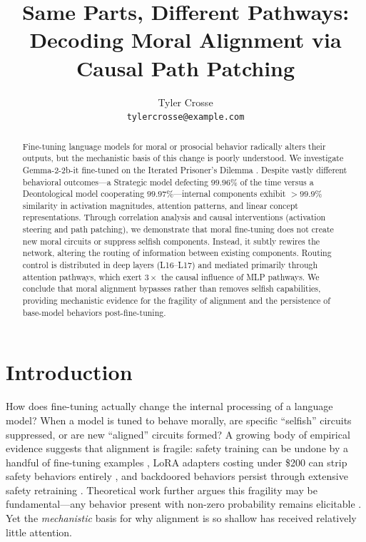 \documentclass[11pt, letterpaper]{article}
\title{\vspace{-1.5cm}\textbf{Same Parts, Different Pathways: \\ Decoding Moral Alignment via Causal Path Patching}}
\author{
  Tyler Crosse \\
  \texttt{tylercrosse@example.com}
}
\date{}
\begin{document}
\maketitle

\vspace{-1cm}
\begin{abstract}
Fine-tuning language models for moral or prosocial behavior radically alters their outputs, but the mechanistic basis of this change is poorly understood. We investigate Gemma-2-2b-it fine-tuned on the Iterated Prisoner's Dilemma \citep{tennant2024moral}. Despite vastly different behavioral outcomes---a Strategic model defecting $99.96\%$ of the time versus a Deontological model cooperating $99.97\%$---internal components exhibit $>99.9\%$ similarity in activation magnitudes, attention patterns, and linear concept representations. Through correlation analysis and causal interventions (activation steering and path patching), we demonstrate that moral fine-tuning does not create new moral circuits or suppress selfish components. Instead, it subtly rewires the network, altering the routing of information between existing components. Routing control is distributed in deep layers (L16--L17) and mediated primarily through attention pathways, which exert $3\times$ the causal influence of MLP pathways. We conclude that moral alignment bypasses rather than removes selfish capabilities, providing mechanistic evidence for the fragility of alignment and the persistence of base-model behaviors post-fine-tuning.
\end{abstract}

\section{Introduction}

How does fine-tuning actually change the internal processing of a language model? When a model is tuned to behave morally, are specific ``selfish'' circuits suppressed, or are new ``aligned'' circuits formed? A growing body of empirical evidence suggests that alignment is fragile: safety training can be undone by a handful of fine-tuning examples \citep{qi2023finetuning}, LoRA adapters costing under \$200 can strip safety behaviors entirely \citep{lermen2023lora}, and backdoored behaviors persist through extensive safety retraining \citep{hubinger2024sleeper}. Theoretical work further argues this fragility may be fundamental---any behavior present with non-zero probability remains elicitable \citep{wolf2024fundamental}. Yet the \textit{mechanistic} basis for why alignment is so shallow has received relatively little attention.
\end{document}
